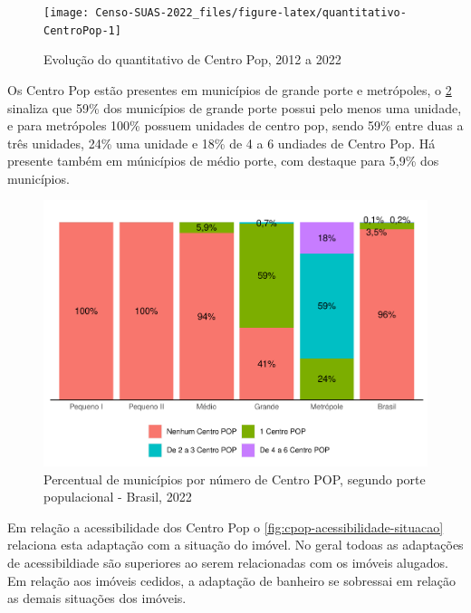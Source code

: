 \documentclass[
  brazilian]{report}
\begin{document}
\begin{figure}
\texttt{[image: Censo-SUAS-2022\_files/figure-latex/quantitativo-CentroPop-1]} \caption[Evolução do quantitativo de Centro Pop, 2012 a 2022]{Evolução do quantitativo de Centro Pop, 2012 a 2022}\label{fig:quantitativo-CentroPop}
\end{figure}

Os Centro Pop estão presentes em municípios de grande porte e
metrópoles, o \cref{fig:cpop-porte} sinaliza que 59\% dos municípios de
grande porte possui pelo menos uma unidade, e para metrópoles 100\%
possuem unidades de centro pop, sendo 59\% entre duas a três unidades,
24\% uma unidade e 18\% de 4 a 6 undiades de Centro Pop. Há presente
também em múnicípios de médio porte, com destaque para 5,9\% dos
municípios.

\begin{figure}
\includegraphics{Censo-SUAS-2022_files/figure-latex/cpop-porte-1} \caption[Percentual de municípios por número de Centro POP, segundo porte populacional - Brasil, 2022]{Percentual de municípios por número de Centro POP, segundo porte populacional - Brasil, 2022}\label{fig:cpop-porte}
\end{figure}

Em relação a acessibilidade dos Centro Pop o
\cref{fig:cpop-acessibilidade-situacao} relaciona esta adaptação com a
situação do imóvel. No geral todoas as adaptações de acessibildiade são
superiores ao serem relacionadas com os imóveis alugados. Em relação aos
imóveis cedidos, a adaptação de banheiro se sobressai em relação as
demais situações dos imóveis.
\end{document}
